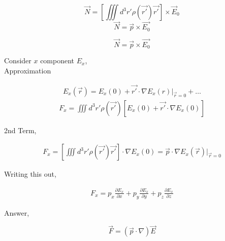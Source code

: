 \documentclass[svgnames]{article}   	%
\begin{document}
\[
  \vec{N} = \left[\iiint d^3r' \rho(\vec{r'}) \vec{r'} \right] \times \vec{E}_0
\]
\[
  \vec{N} = \vec{p} \times \vec{E_0}
\]

\begin{tcolorbox}[colback = blue!5!white, colframe = blue!50!black, title
  = Torque Equation]
  
  \[
    \vec{N} = \vec{p} \times \vec{E_0}
  \]
  
  

\end{tcolorbox}



Consider $x$ component $E_x$,\\ 

Approximation 

\begin{align*}
  E_x(\vec{r}) = E_x(0) + \vec{r'} \cdot \nabla E_x(r)\Big|_{\vec{r} = 0} + \dots
\end{align*}
\begin{align*}
  F_x = \iiint d^3r' \rho(\vec{r'}) [E_x(0) + \vec{r'} \cdot \nabla E_x(0)]
\end{align*}

2nd Term, 

\begin{align*}
  F_x = \left[\iiint d^3r' \rho(\vec{r'}) \vec{r'} \right] \cdot \nabla E_x(0)
  = \vec{p} \cdot \nabla E_x (\vec{r}) \Big|_{\vec{r}=0}
\end{align*}

Writing this out, 

\begin{align*}
  F_x = p_x \frac{\partial E_x}{\partial x} + p_y \frac{\partial E_x}{\partial
  y} + p_z \frac{\partial E_x}{\partial z} 
\end{align*}

Answer, 

\[
  \vec{F} = (\vec{p} \cdot \nabla)\vec{E}
\]
\end{document}
